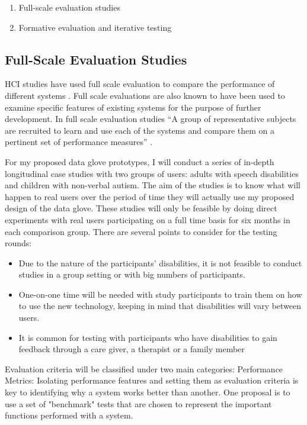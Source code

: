 \begin{enumerate}
    \item Full-scale evaluation studies
    \item Formative evaluation and iterative testing
\end{enumerate}

\subsection{Full-Scale Evaluation Studies} 

HCI studies have used full scale evaluation to compare the performance of different systems \parencite{Wania2006}. Full scale evaluations are also known to have been used to examine specific features of existing systems for the purpose of further development. In full scale evaluation studies  ``A group of representative subjects are recruited to learn and use each of the systems and compare them on a pertinent set of performance measures'' \parencite{Cox2008}.

For my proposed data glove prototypes, I will conduct a series of in-depth longitudinal case studies with two groups of users: adults with speech disabilities and children with non-verbal autism. The aim of the studies is to know what will happen to real users over the period of time they will actually use my proposed design of the data glove. These studies will only be feasible by doing direct experiments with real users participating on a full time basis for six months in each comparison group. There are several points to consider for the testing rounds:

\begin{itemize}
    \item Due to the nature of the participants' disabilities, it is not feasible to conduct studies in a group setting or with big numbers of participants.
    \item One-on-one time will be needed with study participants to train them on how to use the new technology, keeping in mind that disabilities will vary between users. 
    \item It is common for testing with participants who have disabilities to gain feedback through a care giver, a therapist or a family member \parencite{Lazar2010}
\end{itemize}

Evaluation criteria will be classified under two main categories:
Performance Metrics: Isolating performance features and setting them as evaluation criteria is key to identifying why a system works better than another. One proposal \parencite{Roberts1983} is to use a set of "benchmark" tests that are chosen to represent the important functions performed with a system.

